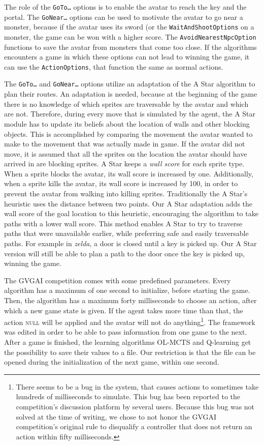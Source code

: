 The role of the \texttt{GoTo\ldots} options is to enable the avatar to reach the
key and the portal. The \texttt{GoNear\ldots} options can be used to motivate
the avatar to go near a monster, because if the avatar uses its sword (or the
\texttt{WaitAndShootOptions} on a monster, the game can be won with a higher
score. The \texttt{AvoidNearestNpcOption} functions to save the avatar from
monsters that come too close. If the algorithms encounters a game in which these
options can not lead to winning the game, it can use the \texttt{ActionOptions},
that function the same as normal actions.

The \texttt{GoTo\ldots} and \texttt{GoNear\ldots} options utilize an adaptation
of the A Star algorithm to plan their routes. An adaptation is needed, because
at the beginning of the game there is no knowledge of which sprites are
traversable by the avatar and which are not. Therefore, during every move that
is simulated by the agent, the A Star module has to update its beliefs about the
location of walls and other blocking objects. This is accomplished by comparing
the movement the avatar wanted to make to the movement that was actually made in
game. If the avatar did not move, it is assumed that all the sprites on the
location the avatar should have arrived in are blocking sprites. A Star keeps a
\emph{wall score} for each sprite type. When a sprite blocks the avatar, its
wall score is increased by one. Additionally, when a sprite kills the avatar,
its wall score is increased by 100, in order to prevent the avatar from walking
into killing sprites.  Traditionally the A Star's heuristic uses the distance
between two points. Our A Star adaptation adds the wall score of the goal
location to this heuristic, encouraging the algorithm to take paths with a lower
wall score. This method enables A Star to try to traverse paths that were
unavailable earlier, while preferring safe and easily traversable paths. For
example in \textit{zelda}, a door is closed until a key is picked up. Our A Star
version will still be able to plan a path to the door once the key is picked up,
winning the game.

The GVGAI competition comes with some predefined parameters. Every algorithm has
a maximum of one second to initialize, before starting the game. Then, the
algorithm has a maximum forty milliseconds to choose an action, after which a
new game state is given. If the agent takes more time than that, the action
\textsc{null} will be applied and the avatar will not do anything\footnote{There
seems to be a bug in the system, that causes actions to sometimes take hundreds
of milliseconds to simulate. This bug has been reported to the competition's
discussion platform by several users. Because this bug was not solved at the
time of writing, we chose to not honor the GVGAI competition's original rule to
disqualify a controller that does not return an action within fifty
milliseconds.}. The framework was edited in order to be able to pass information
from one game to the next. After a game is finished, the learning algorithms
OL-MCTS and Q-learning get the possibility to save their values to a file. Our
restriction is that the file can be opened during the initialization of the next
game, within one second. 


